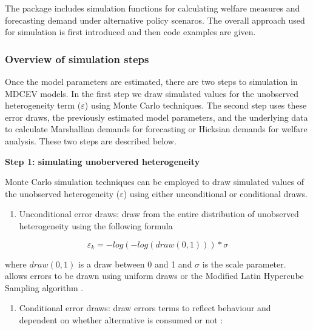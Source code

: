 The  package includes simulation functions for calculating
welfare measures and forecasting demand under alternative policy
scenaros. The overall approach used for simulation is first introduced
and then code examples are given.

\hypertarget{overview-of-simulation-steps}{%
\subsubsection{Overview of simulation
steps}\label{overview-of-simulation-steps}}

Once the model parameters are estimated, there are two steps to
simulation in MDCEV models. In the first step we draw simulated values
for the unobserved heterogeneity term (\(\varepsilon\)) using Monte
Carlo techniques. The second step uses these error draws, the previously
estimated model parameters, and the underlying data to calculate
Marshallian demands for forecasting or Hicksian demands for welfare
analysis. These two steps are described below.

\textbf{Step 1: simulating unobervered heterogeneity}

Monte Carlo simulation techniques can be employed to draw simulated
values of the unobserved heterogeneity (\(\varepsilon\)) using either
unconditional or conditional draws.

\begin{enumerate}
\def\labelenumi{\arabic{enumi}.}
\tightlist
\item
  Unconditional error draws: draw from the entire distribution of
  unobserved heterogeneity using the following formula
\end{enumerate}

\begin{equation}
\varepsilon_{k} = -log(-log(draw(0,1))) * \sigma
\end{equation}

where \(draw(0,1)\) is a draw between 0 and 1 and \(\sigma\) is the
scale parameter.  allows errors to be drawn using uniform
draws or the Modified Latin Hypercube Sampling algorithm
\citep{hesson2006}.

\begin{enumerate}
\def\labelenumi{\arabic{enumi}.}
\setcounter{enumi}{1}
\tightlist
\item
  Conditional error draws: draw errors terms to reflect behaviour and
  dependent on whether alternative is consumed or not
  \citep{vonhaefenincorporating2003, vonhaefenestimation2004}:
\end{enumerate}

